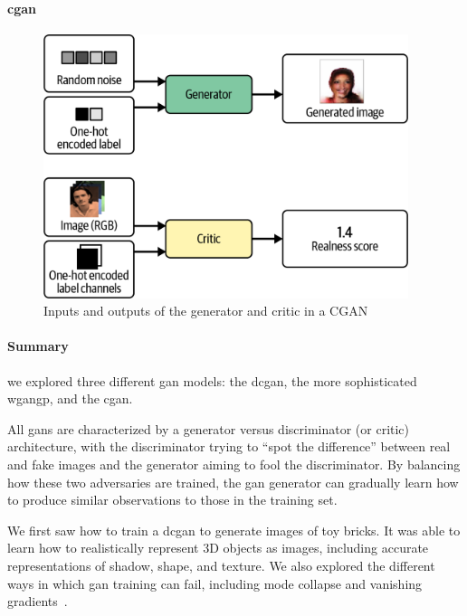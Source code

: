 \paragraph{\gls{cgan}}

\begin{figure}
	\begin{center}
		\includegraphics[width=0.95\textwidth]{figures/cgan}
	\end{center}
	\caption{Inputs and outputs of the generator and critic in a CGAN}\label{fig:cgan}
\end{figure}

\paragraph{Summary}

we explored three different \gls{gan} models: the \gls{dcgan}, the more sophisticated \gls{wgangp}, and the \gls{cgan}.

All \glspl{gan} are characterized by a generator versus discriminator (or critic) architecture, with the discriminator trying to ``spot the difference'' between real and fake images and the generator aiming to fool the discriminator.
By balancing how these two adversaries are trained, the \gls{gan} generator can gradually learn how to produce similar observations to those in the training set.

We first saw how to train a \gls{dcgan} to generate images of toy bricks.
It was able to learn how to realistically represent 3D objects as images, including accurate representations of shadow, shape, and texture.
We also explored the different ways in which \gls{gan} training can fail, including mode collapse and vanishing gradients~\cite{foster2022generative}.


